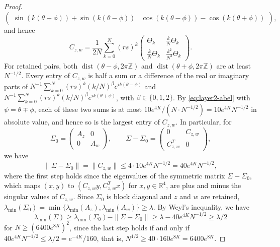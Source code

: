 \begin{proof}
\[\begin{pmatrix}
 \sin(k(\theta+\phi))+\sin(k(\theta-\phi))&
 \cos(k(\theta-\phi))-\cos(k(\theta+\phi))
 \end{pmatrix},
\]
and hence
\[
 C_{z,w}=\frac1{2N}\sum_{k=0}^N(rs)^k
 \begin{pmatrix}\Theta_k&\frac kN\Theta_k\\\frac kN\Theta_k&\frac{k^2}{N^2}\Theta_k\end{pmatrix}.
\]
For retained pairs, both $\operatorname{dist}(\theta-\phi,2\pi\mathbb Z)$ and
$\operatorname{dist}(\theta+\phi,2\pi\mathbb Z)$ are at least
$N^{-1/2}$.
Every entry of $C_{z,w}$ is half a sum or a difference of the real or
imaginary parts of
$N^{-1}\sum_{k=0}^N(rs)^k(k/N)^\beta e^{ik(\theta-\phi)}$ and
$N^{-1}\sum_{k=0}^N(rs)^k(k/N)^\beta e^{ik(\theta+\phi)}$, with
$\beta\in\{0,1,2\}$. By \eqref{eq:layer2-abel} with $\psi=\theta\mp\phi$,
each of these two sums is at most $10e^{4K}/(N\cdot N^{-1/2})=10e^{4K}N^{-1/2}$
in absolute value, and hence so is the largest entry of $C_{z,w}$.
In particular, for
\[
 \Sigma_0=\begin{pmatrix}A_z&0\\0&A_w\end{pmatrix},\qquad
 \Sigma-\Sigma_0=\begin{pmatrix}0&C_{z,w}\\C_{z,w}^T&0\end{pmatrix},
\]
we have
\[
 \|\Sigma-\Sigma_0\|=\|C_{z,w}\|\le4\cdot10e^{4K}N^{-1/2}=40e^{4K}N^{-1/2},
\]
where the first step holds since the eigenvalues of the symmetric matrix
$\Sigma-\Sigma_0$, which maps $(x,y)$ to $(C_{z,w}y,C_{z,w}^Tx)$ for
$x,y\in\mathbb R^4$, are plus and minus the singular values of $C_{z,w}$.
Since $\Sigma_0$ is block diagonal and $z$ and $w$ are retained,
$\lambda_{\min}(\Sigma_0)=\min\{\lambda_{\min}(A_z),\lambda_{\min}(A_w)\}\ge\lambda$.
By Weyl's inequality, we have
\[
 \lambda_{\min}(\Sigma)\ge\lambda_{\min}(\Sigma_0)-\|\Sigma-\Sigma_0\|
 \ge\lambda-40e^{4K}N^{-1/2}
 \ge\lambda/2
\]
for $N\ge(6400e^{8K})^2$, since the last step holds if and only if
$40e^{4K}N^{-1/2}\le\lambda/2=e^{-4K}/160$, that is,
$N^{1/2}\ge40\cdot160e^{8K}=6400e^{8K}$.


\end{proof}
